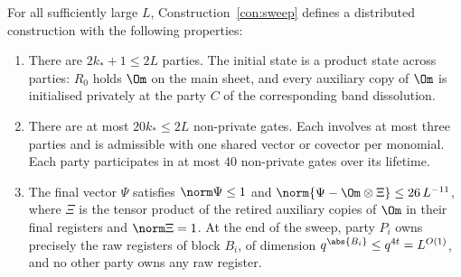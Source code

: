 \begin{proposition}\label{prop:sweep}
For all sufficiently large $L$, Construction~\ref{con:sweep} defines a
distributed construction with the following properties:
\begin{enumerate}[leftmargin=2em]
\item There are $2k_*+1\le 2L$ parties. The initial state is a product state across
parties: $R_0$ holds $\Om$ on the main sheet, and every auxiliary copy of $\Om$ is initialised
privately at the party $C$ of the corresponding band dissolution.
\item There are at most $20k_*\le 2L$ non-private gates. Each involves at
most three parties and is admissible with one shared vector or covector
per monomial. Each party participates in at most $40$ non-private gates
over its lifetime.
\item The final vector $\Psi$ satisfies $\norm\Psi\le1$ and
$\norm{\Psi-\Om\otimes\Xi}\le 26\,L^{-11}$, where $\Xi$ is the tensor
product of the retired auxiliary copies of $\Om$ in their final registers
and $\norm\Xi=1$. At the end of the sweep, party $P_i$ owns precisely the raw registers
of block $B_i$, of dimension $q^{\abs{B_i}}\le q^{4t}=L^{O(1)}$, and no other
party owns any raw register.
\end{enumerate}
\end{proposition}
